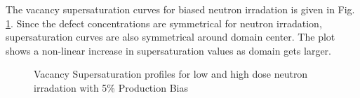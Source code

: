 \documentclass[a4paper]{article}
\begin{document}
    The vacancy supersaturation curves for biased neutron irradation is given in Fig. \ref{figure:vacancy_supersaturation_neutron_5}. Since the defect concentrations are symmetrical for neutron irradation, supersaturation curves are also symmetrical around domain center. The plot shows a non-linear increase in supersaturation values as domain gets larger.
      \begin{figure}[h!]  %
        \centering
        \qquad
        \caption{Vacancy Supersaturation profiles for low and high dose neutron irradation with 5\% Production Bias}
        \label{figure:vacancy_supersaturation_neutron_5}
      \end{figure}
\end{document}
